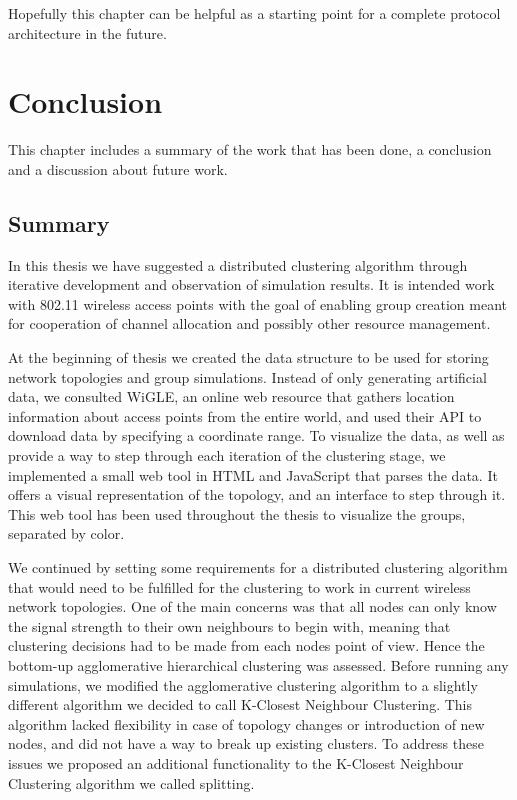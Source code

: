 Hopefully this chapter can be helpful as a starting point for a complete protocol architecture in the future. 

\chapter{Conclusion}
This chapter includes a summary of the work that has been done, a conclusion and a discussion about future work. 
\section{Summary}
In this thesis we have suggested a distributed clustering algorithm through iterative development and observation of simulation results. It is intended work with 802.11 wireless access points
with the goal of enabling group creation meant for cooperation of channel allocation and possibly other resource management. 

At the beginning of thesis we created the data structure to be used for storing network topologies and group simulations. Instead of only generating artificial data,
we consulted WiGLE, an online web resource that gathers location information about access points from the entire world, and used their API to download data by specifying
a coordinate range. To visualize the data, as well as provide a way to step through each iteration of the clustering stage, we implemented a small web tool in HTML and JavaScript that parses the data.
It offers a visual representation of the topology, and an interface to step through it. This web tool has been used throughout the thesis to visualize the groups, separated by color. 

We continued by setting some requirements for a distributed clustering algorithm that would need to be fulfilled for the clustering to work in current wireless network topologies.
One of the main concerns was that all nodes can only know the signal strength to their own neighbours to begin with, meaning that clustering decisions had to be made from each nodes point of view.
Hence the bottom-up agglomerative hierarchical clustering was assessed. Before running any simulations, we modified the agglomerative clustering algorithm to a slightly different algorithm 
we decided to call K-Closest Neighbour Clustering. This algorithm lacked flexibility in case of topology changes or introduction of new nodes, and did not have a way to break up existing clusters.
To address these issues we proposed an additional functionality to the K-Closest Neighbour Clustering algorithm we called splitting.

